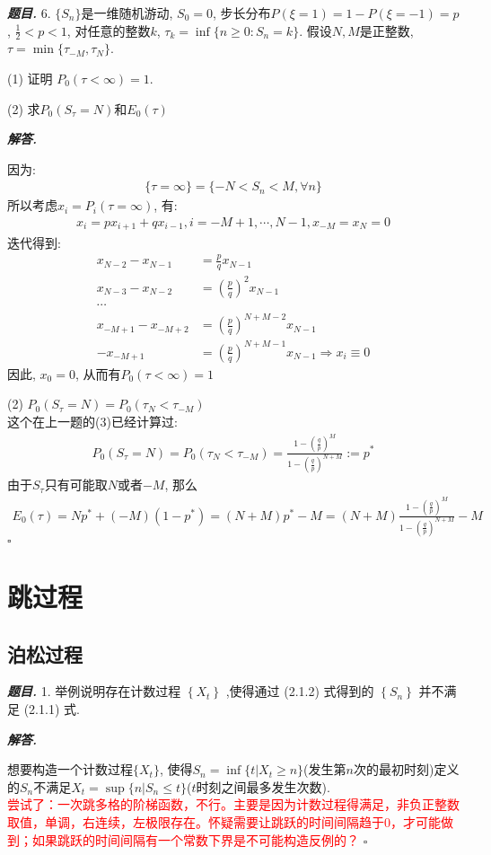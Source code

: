 \documentclass[10pt, a4paper, oneside]{ctexart}
\newenvironment{problem}{\begin{framed}\par\noindent\textbf{\textit{题目. }}}{\end{framed}\par}
\newenvironment{solution}{%
  \par\noindent\textbf{\textit{解答. }}\ignorespaces
}{%
  \hfill\ensuremath{\square}\par %
}
\begin{document}
\begin{problem}
    6. $\{S_n\}$是一维随机游动, $S_0=0$, 步长分布$P(\xi=1)=1-P(\xi=-1)=p$, $\frac{1}{2}<p<1$, 对任意的整数$k$, $\tau_k=\inf\{n\geq 0 : S_n=k\}$. 假设$N,M$是正整数, $\tau=\min\{\tau_{-M},\tau_{N}\}$.

    (1) 证明 $P_0(\tau<\infty)=1$.

    (2) 求$P_0(S_{\tau}=N)$和$E_0(\tau)$
\end{problem}

\begin{solution}
因为:
\begin{align*}
    \{\tau=\infty\}=\{-N<S_n<M,\forall n\}
\end{align*}
所以考虑$x_i=P_i(\tau=\infty)$, 有:
\begin{align*}
    x_i=px_{i+1}+qx_{i-1}, i=-M+1,\cdots,N-1, x_{-M}=x_{N}=0
\end{align*}
迭代得到:
\begin{align*}
    x_{N-2}-x_{N-1}&=\frac{p}{q}x_{N-1}\\
    x_{N-3}-x_{N-2}&=(\frac{p}{q})^2x_{N-1}\\
    \cdots&\\
    x_{-M+1}-x_{-M+2}&=(\frac{p}{q})^{N+M-2}x_{N-1}\\
    -x_{-M+1}&=(\frac{p}{q})^{N+M-1}x_{N-1} \Rightarrow x_i\equiv 0
\end{align*}
因此, $x_0=0$, 从而有$P_0(\tau<\infty)=1$

(2) $P_0(S_{\tau}=N)=P_0(\tau_N<\tau_{-M})$\\
这个在上一题的(3)已经计算过:
\begin{align*}
    P_0(S_{\tau}=N)=P_0(\tau_N<\tau_{-M})=\frac{1-(\frac{q}{p})^M}{1-(\frac{q}{p})^{N+M}}:=p^*
\end{align*}
由于$S_{\tau}$只有可能取$N$或者$-M$, 那么
\begin{align*}
    E_0(\tau)=Np^*+(-M)(1-p^*)=(N+M)p^*-M=(N+M)\frac{1-(\frac{q}{p})^M}{1-(\frac{q}{p})^{N+M}}-M
\end{align*}
\end{solution}

\section{跳过程}
\subsection{泊松过程}

\begin{problem}
    1. 举例说明存在计数过程 \( \left\{  {X}_{t}\right\}   \) ,使得通过 (2.1.2) 式得到的 \( \left\{  {S}_{n}\right\}   \)
并不满足 (2.1.1) 式.
\end{problem}
\begin{solution}
    想要构造一个计数过程$\{X_t\}$, 使得$S_n=\inf\{t|X_t\geq n\}$(发生第$n$次的最初时刻)定义的$S_n$不满足$X_t=\sup\{n|S_n\leq t\}$($t$时刻之间最多发生次数).\\
    \textcolor{red}{尝试了：一次跳多格的阶梯函数，不行。主要是因为计数过程得满足，非负正整数取值，单调，右连续，左极限存在。怀疑需要让跳跃的时间间隔趋于$0$，才可能做到；如果跳跃的时间间隔有一个常数下界是不可能构造反例的？}
\end{solution}
\end{document}

